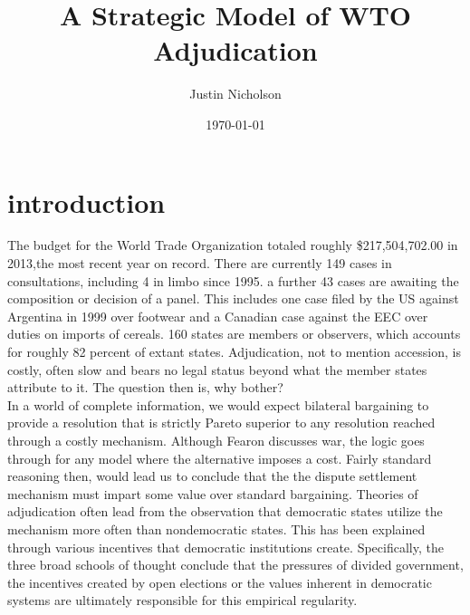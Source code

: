 \documentclass[]{article}
\author{Justin Nicholson}
\date{\today}
\title{A Strategic Model of WTO Adjudication}
\begin{document}
\maketitle
\section{introduction}
The budget for the World Trade Organization totaled roughly \$217,504,702.00 in 2013,the most recent year on record. There are currently 149 cases in consultations, including 4 in limbo since 1995. a further 43 cases are awaiting the composition or decision of a panel. This includes one case filed by the US against Argentina in 1999 over footwear and a Canadian case against the EEC over duties on imports of cereals. 160 states are members or observers, which accounts for roughly 82 percent of extant states. Adjudication, not to mention accession, is costly, often slow and bears no legal status beyond what the member states attribute to it. The question then is, why bother?  \\

In a world of complete information, we would expect bilateral bargaining to provide a resolution that is strictly Pareto superior to any resolution reached through a costly mechanism. Although Fearon discusses war, the logic goes through for any model where the alternative imposes a cost. Fairly standard reasoning then, would lead us to conclude that the the dispute settlement mechanism must impart some value over standard bargaining. Theories of adjudication often lead from the observation that democratic states utilize the mechanism more often than nondemocratic states. This has been explained through various incentives that democratic institutions create. Specifically, the three broad schools of thought conclude that the pressures of divided government, the incentives created by open elections or the values inherent in democratic systems are ultimately responsible for this empirical regularity. \\
 
\end{document}
